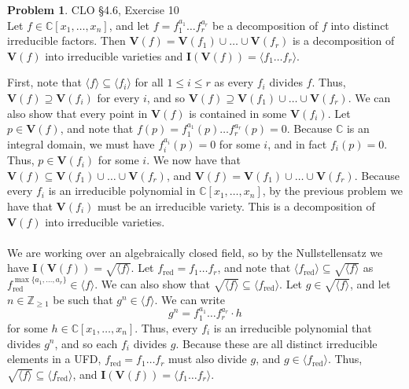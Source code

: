 \documentclass[12pt]{amsart}
\theoremstyle{definition}
\newtheorem{prob}{Problem}
\begin{document}
\begin{flushleft}
\newpage{}
\begin{prob}  CLO \S4.6, Exercise 10 \smallskip \\
Let $f \in \mathbb C[x_1,\dots,x_n]$, and let $f = f_1^{a_1}\dots f_r^{a_r}$ be a decomposition of $f$ into distinct irreducible factors. Then $\mathbf V(f)=\mathbf V(f_1)\cup \dots \cup \mathbf V(f_r)$ is a decomposition of $\mathbf V(f)$ into irreducible varieties and $\mathbf I(\mathbf V(f)) = \langle f_1\dots f_r\rangle$.   
\end{prob}
\bigskip 
First, note that $\langle f\rangle \subseteq \langle f_i\rangle$ for all $1 \le i \le r$ as every $f_i$ divides $f$. Thus, $\mathbf V(f) \supseteq \mathbf V(f_i)$ for every $i$, and so $\mathbf V(f) \supseteq \mathbf V(f_1)\cup \dots\cup \mathbf V(f_r)$. We can also show that every point in $\mathbf V(f)$ is contained in some $\mathbf V(f_i)$. Let $p \in \mathbf V(f)$, and note that $f(p)=f_1^{a_1}(p)\dots f_r^{a_r}(p) = 0$. Because $\mathbb C$ is an integral domain, we must have $f_i^{a_i}(p) = 0$ for some $i$, and in fact $f_i(p)=0$. Thus, $p \in \mathbf V(f_i)$ for some $i$. We now have that $\mathbf V(f) \subseteq \mathbf V(f_1)\cup \dots \cup \mathbf V(f_r)$, and $\mathbf V(f) = \mathbf V(f_1)\cup \dots \cup \mathbf V(f_r)$. Because every $f_i$ is an irreducible polynomial in $\mathbb C[x_1,\dots,x_n]$, by the previous problem we have that $\mathbf V(f_i)$ must be an irreducible variety. This is a decomposition of $\mathbf V(f)$ into irreducible varieties.
\\ \ \\
We are working over an algebraically closed field, so by the Nullstellensatz we have $\mathbf I(\mathbf V(f)) = \sqrt{\langle f\rangle}$. Let $f_\text{red} = f_1\dots f_r$, and note that $\langle f_\text{red}\rangle \subseteq \sqrt{\langle f\rangle}$ as $f_\text{red}^{\max\{a_1,\dots,a_r\}} \in \langle f\rangle$. We can also show that $\sqrt{\langle f \rangle}\subseteq \langle f_\text{red}\rangle$. Let $g\in \sqrt{\langle f \rangle}$, and let $n \in \mathbb Z_{\ge 1}$ be such that $g^n \in \langle f\rangle$. We can write 
\[g^n = f_1^{a_1}\dots f_r^{a_r} \cdot h\]
for some $h \in \mathbb C[x_1,\dots, x_n]$. Thus, every $f_i$ is an irreducible polynomial that divides $g^n$, and so each $f_i$ divides $g$. Because these are all distinct irreducible elements in a UFD, $f_\text{red} = f_1\dots f_r$ must also divide $g$, and $g \in \langle f_\text{red}\rangle$. Thus, $\sqrt{\langle f \rangle} \subseteq \langle f_\text{red}\rangle$, and $\mathbf I(\mathbf V(f)) = \langle f_1\dots f_r\rangle$.
\end{flushleft}
\end{document}
